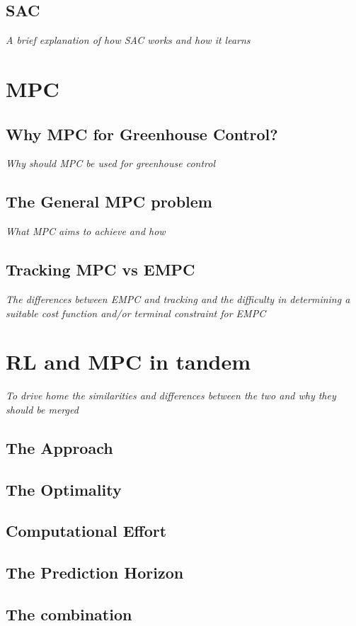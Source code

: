 \subsection{SAC}
\emph{A brief explanation of how SAC works and how it learns}


\section{MPC}
\subsection{Why MPC for Greenhouse Control?}
\emph{Why should MPC be used for greenhouse control}
\subsection {The General MPC problem}
\emph{What MPC aims to achieve and how}

\subsection{Tracking MPC vs EMPC}
\emph{The differences between EMPC and tracking and the difficulty in determining a suitable cost function and/or terminal constraint for EMPC}

\section{RL and MPC in tandem}
\emph{To drive home the similarities and differences between the two and why they should be merged}
\subsection{The Approach}
\subsection{The Optimality}
\subsection{Computational Effort}
\subsection{The Prediction Horizon}
\subsection{The combination}

